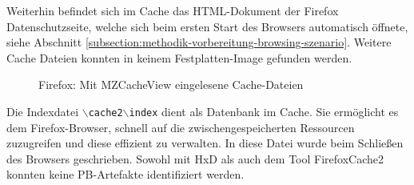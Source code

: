 \begin{appendices}
{
}
\restoregeometry
%


Weiterhin befindet sich im Cache das HTML-Dokument der Firefox Datenschutzseite, welche sich beim ersten Start des Browsers automatisch öffnete, siehe Abschnitt \ref{subsection:methodik-vorbereitung-browsing-szenario}.
Weitere Cache Dateien konnten in keinem Festplatten-Image gefunden werden.
\begin{figure}[h!]
	\caption{Firefox: Mit MZCacheView eingelesene Cache-Dateien}
	\label{img:mzcacheview}
\end{figure}
Die Indexdatei \texttt{$\backslash$cache2$\backslash$index} dient als Datenbank im Cache. Sie ermöglicht es dem Firefox-Browser, schnell auf die zwischengespeicherten Ressourcen zuzugreifen und diese effizient zu verwalten. In diese Datei wurde beim Schließen des Browsers geschrieben. Sowohl mit HxD als auch dem Tool FirefoxCache2 konnten keine PB-Artefakte identifiziert werden.


\end{appendices}
